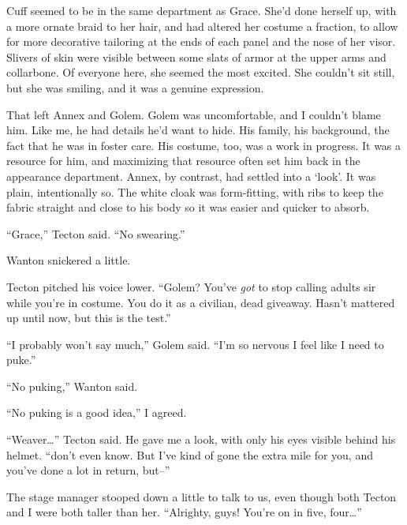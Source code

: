 Cuff seemed to be in the same department as Grace.  She'd done herself up, with a more ornate braid to her hair, and had altered her costume a fraction, to allow for more decorative tailoring at the ends of each panel and the nose of her visor.  Slivers of skin were visible between some slats of armor at the upper arms and collarbone.  Of everyone here, she seemed the most excited.  She couldn't sit still, but she was smiling, and it was a genuine expression.



That left Annex and Golem.  Golem was uncomfortable, and I couldn't blame him.  Like me, he had details he'd want to hide.  His family, his background, the fact that he was in foster care.  His costume, too, was a work in progress.  It was a resource for him, and maximizing that resource often set him back in the appearance department.  Annex, by contrast, had settled into a `look'.  It was plain, intentionally so.  The white cloak was form-fitting, with ribs to keep the fabric straight and close to his body so it was easier and quicker to absorb.



``Grace,'' Tecton said.  ``No swearing.''



Wanton snickered a little.



Tecton pitched his voice lower.  ``Golem?  You've \emph{got} to stop calling adults sir while you're in costume.  You do it as a civilian, dead giveaway.  Hasn't mattered up until now, but this is the test.''



``I probably won't say much,'' Golem said.  ``I'm so nervous I feel like I need to puke.''



``No puking,'' Wanton said.



``No puking is a good idea,'' I agreed.



``Weaver\ldots'' Tecton said.  He gave me a look, with only his eyes visible behind his helmet.  ``\ldotsI don't even know.  But I've kind of gone the extra mile for you, and you've done a lot in return, but--''



The stage manager stooped down a little to talk to us, even though both Tecton and I were both taller than her.  ``Alrighty, guys!  You're on in five, four\ldots''



